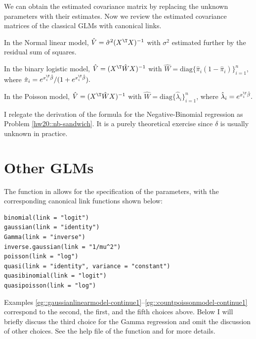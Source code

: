 We can obtain the estimated covariance matrix by replacing the unknown parameters with their estimates. 
Now we review the estimated covariance matrices of the classical GLMs with canonical links. 
\setcounter{example}{0}
\begin{example}[continued]\label{eg::gaussianlinearmodel-continue1}
In the Normal linear model,  
$
\hat{V} =  \hat{\sigma}^2 (X^{\T} X)^{-1}
$
with $ \sigma^2$ estimated further by the residual sum of squares. 
\end{example}



\begin{example}[continued]\label{eg::binarylogisticmodel-continue1}
In the binary logistic model,  
$
\hat{V} = (X^{\T} \hat{W} X)^{-1}
$
with  $\hat{W}= \text{diag}\{ \hat{\pi}_i (1-\hat{\pi}_i) \}_{i=1}^n $, where $ \hat{\pi}_i  = e^{x_i^{\T} \hat{\beta}} / (1+e^{x_i^{\T} \hat{\beta}}).$
\end{example}


\begin{example}[continued]\label{eg::countpoissonmodel-continue1}
In the Poisson model,  
$
\hat{V} = (X^{\T} \hat{W} X)^{-1}
$
with  $\hat{W}= \text{diag}\{ \hat{\lambda}_i   \}_{i=1}^n $, where $\hat{\lambda}_i  = e^{x_i^{\T} \hat{\beta}}.$
\end{example}


I relegate the derivation of the formula for the Negative-Binomial regression as Problem \ref{hw20::nb-sandwich}. It is a purely theoretical exercise since $\delta$ is usually unknown in practice.


\section{Other GLMs}


The  function in  allows for the specification of the  parameters, with the corresponding canonical link functions shown below: 
\begin{lstlisting}
binomial(link = "logit")
gaussian(link = "identity")
Gamma(link = "inverse")
inverse.gaussian(link = "1/mu^2")
poisson(link = "log")
quasi(link = "identity", variance = "constant")
quasibinomial(link = "logit")
quasipoisson(link = "log")
\end{lstlisting}
Examples \ref{eg::gaussianlinearmodel-continue1}--\ref{eg::countpoissonmodel-continue1} correspond to the second, the first, and the fifth choices above. Below I will briefly discuss the third choice for the Gamma regression and omit the discussion of other choices. See the help file of the  function and \citet{mccullagh1989generalized} for more details. 


